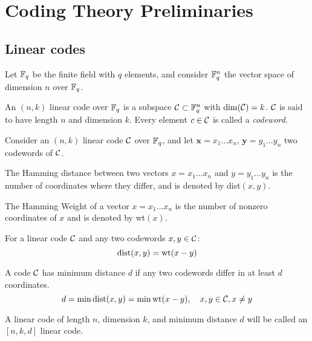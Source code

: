 \chapter{Coding Theory Preliminaries}

\section{Linear codes}
Let ${\mathbb F}_q$ be the finite field with $q$ elements, and consider ${\mathbb F}_q^n$ the vector space of dimension $n$ over ${\mathbb F}_q$.

\begin{defn}
An $(n,k)$ linear code over ${\mathbb F}_q$ is a subspace ${\mathcal C} \subset {\mathbb F}_q^n$ with $\dim ({\mathcal C}) = k$. ${\mathcal C}$ is said to have length $n$ and dimension $k$. Every element $c \in {\mathcal C}$ is called a \textit{codeword}.
\end{defn}

Consider an $(n,k)$ linear code ${\mathcal C}$ over ${\mathbb F}_q$, and let $\mathbf{x} = x_1 \dots x_n$, $\mathbf{y} = y_1 \dots y_n$ two codewords of ${\mathcal C}$.

\begin{defn}
The Hamming distance between two vectors $x = x_1 \dots x_n$ and $y = y_1 \dots y_n$ is the number of coordinates where they differ, and is denoted by dist$(x,y)$.
\end{defn}

\begin{defn}
The Hamming Weight of a vector $x = x_1 \dots x_n$ is the number of nonzero coordinates of $x$ and is denoted by wt$(x)$.
\end{defn}

\begin{remk}
For a linear code ${\mathcal C}$ and any two codewords $x,y \in {\mathcal C}$:
\begin{equation}
\mbox{dist}(x,y) = \mbox{wt}(x-y)
\end{equation}
\end{remk}

\begin{defn}
A code ${\mathcal C}$ has minimum distance $d$ if any two codewords differ in at least $d$ coordinates.
\begin{equation}
d = \min \mbox{dist} (x,y) = \min \mbox{wt} (x-y), \quad x,y \in {\mathcal C}, x \neq y
\end{equation}
\end{defn}

A linear code of length $n$, dimension $k$, and minimum distance $d$ will be called an $[n,k,d]$ linear code.

